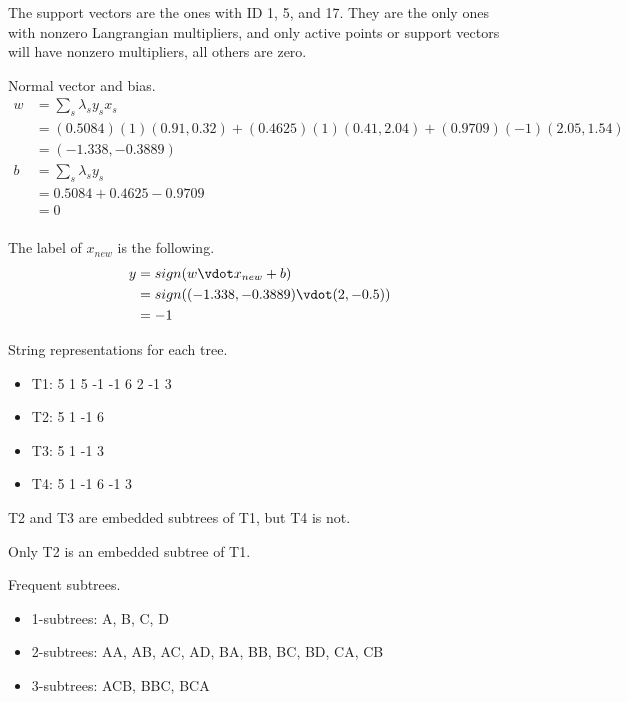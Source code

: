 \documentclass{homework}
\begin{document}
\maketitle


\question
The support vectors are the ones with ID 1, 5, and 17. They are the only ones with nonzero Langrangian multipliers, and only active points or support vectors will have nonzero multipliers, all others are zero.

Normal vector and bias.
\begin{align*}
    w	&=	\sum_s  \lambda_s y_s x_s	\\
        &=  (0.5084)(1)(0.91, 0.32) + (0.4625)(1)(0.41, 2.04) + (0.9709)(-1)(2.05, 1.54)    \\
        &=  (-1.338, -0.3889)   \\
    b   &=  \sum_s \lambda_s y_s    \\
        &=  0.5084 + 0.4625 - 0.9709    \\
        &=  0   \\
\end{align*}

The label of $x_{new}$ is the following.
\begin{align*}
    y	&=	sign(w \vdot x_{new} + b)	\\
        &=  sign((-1.338, -0.3889) \vdot (2, -0.5)) \\
        &=  -1
\end{align*}


\question

String representations for each tree.
\begin{itemize}
    \item T1: 5 1 5 -1 -1 6 2 -1 3
    \item T2: 5 1 -1 6
    \item T3: 5 1 -1 3
    \item T4: 5 1 -1 6 -1 3
\end{itemize}

T2 and T3 are embedded subtrees of T1, but T4 is not.

Only T2 is an embedded subtree of T1.


\question
Frequent subtrees.
\begin{itemize}
    \item 1-subtrees: A, B, C, D
    \item 2-subtrees: AA, AB, AC, AD, BA, BB, BC, BD, CA, CB
    \item 3-subtrees: ACB, BBC, BCA
\end{itemize}
\end{document}
